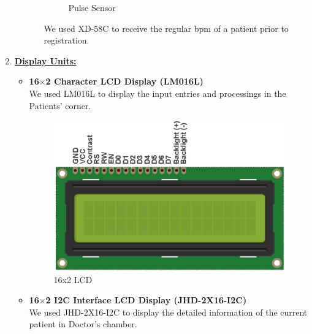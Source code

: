 \documentclass[a4paper,12pt]{article}
\begin{document}
\begin{enumerate}
\begin{itemize}
\begin{itemize}
\begin{figure}[H]
				    \caption{Pulse Sensor}
				    \label{fig:my_label}
				\end{figure}
				We used XD-58C to receive the regular bpm of a patient prior to registration.
			\end{itemize}
		\end{itemize}
	
		\item \underline{\textbf{Display Units:}}
		\begin{itemize}
			\item \textbf{16$\times$2 Character LCD Display (LM016L)} \\
			We used LM016L to display the input entries and processings in the Patients' corner.
			\begin{figure}[H]
			    \centering
			    \includegraphics[scale=0.2]{imgs/16x2_lcd.jpg}
			    \caption{16x2 LCD}
			    \label{fig:my_label}
			\end{figure}
			\item \textbf{16$\times$2 I2C Interface LCD Display (JHD-2X16-I2C)} \\
			We used JHD-2X16-I2C to display the detailed information of the current patient in Doctor's chamber.
		\end{itemize}
	\end{enumerate}
	
	
\end{document}
